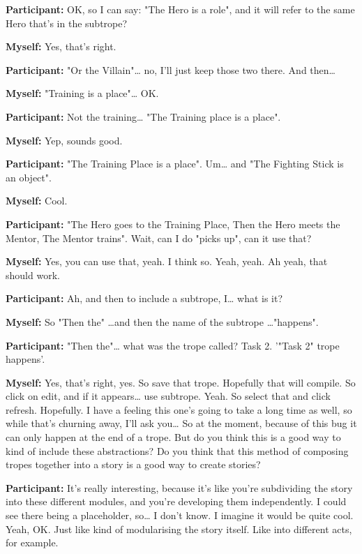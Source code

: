 \documentclass[11pt]{report}
\begin{document}
\begin{linenumbers}
\textbf{Participant:} OK, so I can say: "The Hero is a role", and it will refer to the same Hero that's in the subtrope?

\textbf{Myself:} Yes, that's right.

\textbf{Participant:} "Or the Villain"\ldots{} no, I'll just keep those two there. And then\ldots{}

\textbf{Myself:} "Training is a place"\ldots{} OK.

\textbf{Participant:} Not the training\ldots{} "The Training place is a place".

\textbf{Myself:} Yep, sounds good.

\textbf{Participant:} "The Training Place is a place". Um\ldots{} and "The Fighting Stick is an object".

\textbf{Myself:} Cool.

\textbf{Participant:} "The Hero goes to the Training Place, Then the Hero meets the Mentor, The Mentor trains". Wait, can I do "picks up", can it use that?

\textbf{Myself:} Yes, you can use that, yeah. I think so. Yeah, yeah. Ah yeah, that should work.

\textbf{Participant:} Ah, and then to include a subtrope, I\ldots{} what is it?

\textbf{Myself:} So "Then the" \ldots{}and then the name of the subtrope \ldots{}"happens".

\textbf{Participant:} "Then the"\ldots{} what was the trope called? Task 2. '"Task 2" trope happens'.

\textbf{Myself:} Yes, that's right, yes. So save that trope. Hopefully that will compile. So click on edit, and if it appears\ldots{} use subtrope. Yeah. So select that and click refresh. Hopefully. I have a feeling this one's going to take a long time as well, so while that's churning away, I'll ask you\ldots{} So at the moment, because of this bug it can only happen at the end of a trope. But do you think this is a good way to kind of include these abstractions? Do you think that this method of composing tropes together into a story is a good way to create stories?

\textbf{Participant:} It's really interesting, because it's like you're subdividing the story into these different modules, and you're developing them independently. I could see there being a placeholder, so\ldots{} I don't know. I imagine it would be quite cool. Yeah, OK. Just like kind of modularising the story itself. Like into different acts, for example.


\end{linenumbers}
\end{document}
